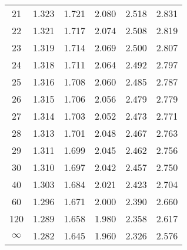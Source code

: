 \begin{center}
\begin{tabular}{|c|ccccc|}
21&  1.323&  1.721&  2.080&  2.518&  2.831\\
22&  1.321&  1.717&  2.074&  2.508&  2.819\\
23&  1.319&  1.714&  2.069&  2.500&  2.807\\
24&  1.318&  1.711&  2.064&  2.492&  2.797\\
25&  1.316&  1.708&  2.060&  2.485&  2.787\\
26&  1.315&  1.706&  2.056&  2.479&  2.779\\
27&  1.314&  1.703&  2.052&  2.473&  2.771\\
28&  1.313&  1.701&  2.048&  2.467&  2.763\\
29&  1.311&  1.699&  2.045&  2.462&  2.756\\
30&  1.310&  1.697&  2.042&  2.457&  2.750\\
40&  1.303&  1.684&  2.021&  2.423&  2.704\\
60&  1.296&  1.671&  2.000&  2.390&  2.660\\
120&  1.289&  1.658&  1.980&  2.358&  2.617\\
\hline
$\infty$ &  1.282&  1.645&  1.960&  2.326&  2.576\\
\hline
\end{tabular}%
\end{center}
